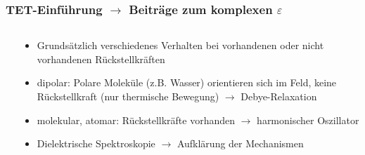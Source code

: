          \begin{frame}
           \frametitle{TET-Einführung \(\to\) Beiträge zum komplexen \(\varepsilon\)}
           \begin{columns}[t]
             \begin{column}{.6\textwidth}
               
               \centering
             \end{column}
             \begin{column}{.4\textwidth}
               \begin{itemize}
                 \item Grundsätzlich verschiedenes Verhalten bei
                   vorhandenen oder nicht vorhandenen Rückstellkräften
                   \item dipolar: Polare Moleküle (z.B. Wasser)
                     orientieren sich im Feld, keine Rückstellkraft
                     (nur thermische Bewegung) $\to$ Debye-Relaxation
                     \item molekular, atomar: Rückstellkräfte
                       vorhanden $\to$ harmonischer Oszillator
                       \item Dielektrische Spektroskopie $\to$
                         Aufklärung der Mechanismen
                 \end{itemize}
             \end{column}
           \end{columns}
         \end{frame}


